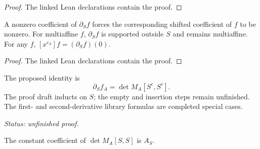 \begin{proof}

\leanok

The linked Lean declarations contain the proof.

\end{proof}

\begin{lemma}

\label{lem:mixed-support}


\leanok


A nonzero coefficient of $\partial_S f$ forces the corresponding shifted coefficient
of $f$ to be nonzero. For multiaffine $f$, $\partial_S f$ is supported outside $S$
and remains multiaffine. For any $f$, $[x^{e_S}]f=(\partial_S f)(0)$.

\end{lemma}

\begin{proof}

\leanok

The linked Lean declarations contain the proof.

\end{proof}

\begin{lemma}

\label{lem:mixed-det}


\leanok


The proposed identity is
\[ \partial_S f_A=\det M_A[S^c,S^c]. \]
The proof draft inducts on $S$; the empty and insertion steps remain unfinished.
The first- and second-derivative library formulas are completed special cases.

\end{lemma}

\noindent\emph{Status: unfinished proof.}

\begin{lemma}

\label{lem:constant-minor}


\leanok


The constant coefficient of $\det M_A[S,S]$ is $A_S$.

\end{lemma}

